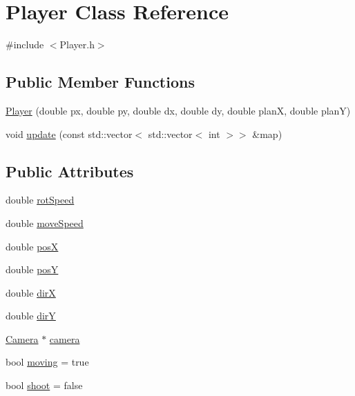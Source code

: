 \hypertarget{classPlayer}{\section{Player Class Reference}
\label{classPlayer}
}


{\ttfamily \#include $<$Player.\-h$>$}

\subsection*{Public Member Functions}
\begin{DoxyCompactItemize}
\item 
\hyperlink{classPlayer_a67d77586ab601669393cf4d396a731cf}{Player} (double px, double py, double dx, double dy, double plan\-X, double plan\-Y)
\item 
void \hyperlink{classPlayer_af6ff6eddbeef407883242dd18c96291b}{update} (const std\-::vector$<$ std\-::vector$<$ int $>$$>$ \&map)
\end{DoxyCompactItemize}
\subsection*{Public Attributes}
\begin{DoxyCompactItemize}
\item 
double \hyperlink{classPlayer_aa380cf130324054d55184b777dc4cdfa}{rot\-Speed}
\item 
double \hyperlink{classPlayer_ad05e8e79181516d5edf65eca5d52d4df}{move\-Speed}
\item 
double \hyperlink{classPlayer_a1c39a22c1f41f7bcc351fcfb5598d823}{pos\-X}
\item 
double \hyperlink{classPlayer_a683e60e3b76893cc5f1c0d54396cc201}{pos\-Y}
\item 
double \hyperlink{classPlayer_a70c1e9d775acdb0de11c2d03a4d3bdf2}{dir\-X}
\item 
double \hyperlink{classPlayer_a20d72dcab9c6d4380fab2f1f5df549ae}{dir\-Y}
\item 
\hyperlink{classCamera}{Camera} $\ast$ \hyperlink{classPlayer_a91d4e9d955f3df0600c2f1504771f5be}{camera}
\item 
bool \hyperlink{classPlayer_aaf48c4184bee665e1f7f625dedc25adf}{moving} = true
\item 
bool \hyperlink{classPlayer_a598f2ce22ba8f9b61bd3f38a61183bc6}{shoot} = false
\end{DoxyCompactItemize}


